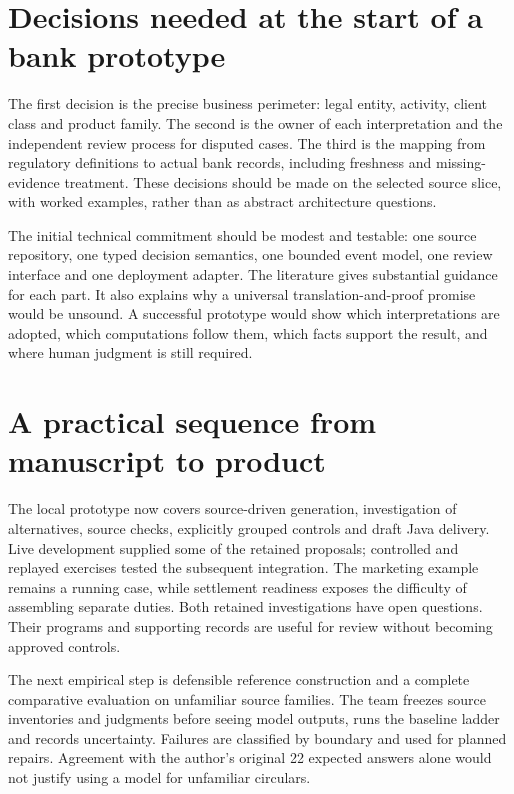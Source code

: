 \documentclass[12pt,a4paper,oneside,openany]{book}
\begin{document}
\section{Decisions needed at the start of a bank prototype}
\label{merge:P-05-evidence:03}


The first decision is the precise business perimeter: legal entity, activity,
client class and product family. The second is the owner of each interpretation
and the independent review process for disputed cases. The third is the mapping
from regulatory definitions to actual bank records, including freshness and
missing-evidence treatment. These decisions should be made on the selected source
slice, with worked examples, rather than as abstract architecture questions.

The initial technical commitment should be modest and testable: one source
repository, one typed decision semantics, one bounded event model, one review
interface and one deployment adapter. The literature gives substantial guidance
for each part. It also explains why a universal translation-and-proof promise
would be unsound. A successful prototype would show which interpretations are
adopted, which computations follow them, which facts support the result, and where
human judgment is still required.

\section{A practical sequence from manuscript to product}
\label{merge:M10:14}


The local prototype now covers source-driven generation, investigation of
alternatives, source checks, explicitly grouped controls and draft Java delivery.
Live development supplied some of the retained proposals; controlled and replayed
exercises tested the subsequent integration. The marketing example remains a
running case, while settlement readiness exposes the difficulty of assembling
separate duties. Both retained investigations have open questions. Their programs
and supporting records are useful for review without becoming approved controls.

The next empirical step is defensible reference construction and a complete
comparative evaluation on unfamiliar source families. The team freezes source inventories and judgments before seeing
model outputs, runs the baseline ladder and records uncertainty. Failures are
classified by boundary and used for planned repairs. Agreement with the author's original 22 expected answers alone would not justify
using a model for unfamiliar circulars.
\end{document}
